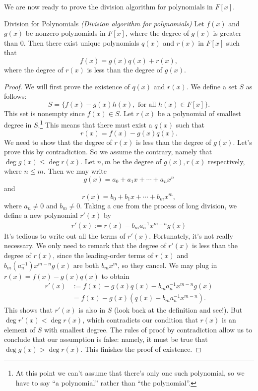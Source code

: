 We are now ready to prove the division algorithm for polynomials in $F[x]$.

\begin{prop}{Division for Polynomials} \emph{(Division algorithm for polynomials)}
Let $f(x)$ and $g(x)$ be nonzero polynomials in $F[x]$, where the degree of $g(x)$ is greater than 0.  Then there exist unique polynomials $q(x)$ and $r(x)$ in $F[x]$ such that 
\[
f(x) = g(x)q(x) + r(x),
\]
where the degree of $r(x)$ is less than the degree of $g(x)$.
\end {prop}

\begin{proof}
We will first prove the existence of $q(x)$ and $r(x)$. We define a set $S$ as follows: 
\[S = \{f(x) - g(x) h(x), \text{ for all } h(x) \in F[x] \}.\] 
 This set is nonempty since $f(x) \in
S$. 
Let
$r(x)$ be  a polynomial of smallest degree in $S$.\footnote{At this point we can't assume that there's only one such polynomial, so we have to say ``a polynomial'' rather than ``the polynomial''.} This means that there must exist a $q(x)$ such that  
\[
r(x) = f(x) - g(x) q(x).
\]
We need to show that the degree of $r(x)$ is less than the degree of
$g(x)$. Let's prove this by contradiction. So we assume the contrary, namely  that $\deg g(x) \leq \deg r(x)$. 
Let $n,m$ be the degree of $g(x),r(x)$ respectively, where $n \leq m$. Then we may write
\[
g(x) = a_0 + a_1 x + \cdots + a_n x^n
\]
and
\[
r(x) = b_0 + b_1 
x + \cdots + b_m x^m, \]
where $a_n \neq 0$ and $b_m \neq 0$. 
Taking a cue from the process of long division, we define a new polynomial $r'(x)$ by
\begin{align*}
r'(x) := r(x) - b_m a_n^{-1} x^{m-n}g(x)
\end{align*}
It's tedious to write out all the terms of $r'(x)$. Fortunately, it's not really necessary. We only need to remark that the degree of $r'(x)$ is less than the degree of $r(x)$, since the leading-order terms of $r(x)$ and $b_m(a_n^{-1}) x^{m-n}g(x)$ are both $b_m x^m$, so they cancel. We may plug in $r(x) = f(x) - g(x) q(x)$ to obtain
\begin{align*}
r'(x) &:=  f(x) - g(x) q(x) - b_m a_n^{-1}  x^{m-n}g(x)\\
&= f(x) - g(x) \left( q(x) - b_m a_n^{-1}  x^{m-n}\right).
\end{align*}
This shows that $r'(x)$ is also in $S$  (look back at the definition and see!).  But 
$\deg r'(x) < \deg r(x)$, which contradicts our condition that $r(x)$ is an element of $S$ with smallest degree. The rules of proof by contradiction allow us to conclude that our assumption is false: namely, it must be true that $\deg g(x) > \deg r(x)$.
This finishes the proof of existence.


\end{proof}
